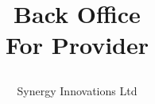 \documentclass[../main/main.tex]{subfiles}
\title{\par{\titletextfont Back Office\\For Provider}}
\author{Synergy Innovations Ltd}
\begin{document}
\begin{titlingpage*}
  \maketitle
\end{titlingpage*}
\end{document}
